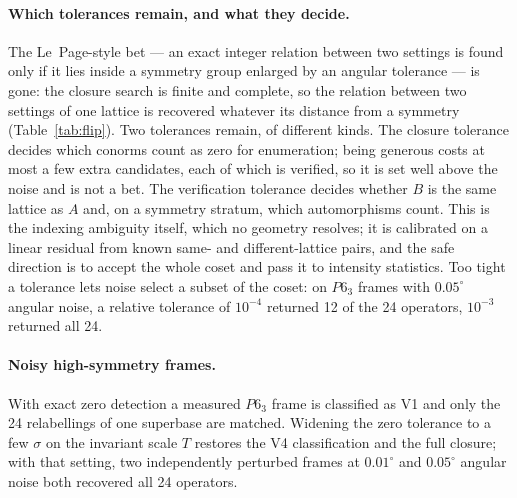\documentclass[11pt]{article}
\begin{document}
\paragraph{Which tolerances remain, and what they decide.}
The Le~Page-style bet --- an exact integer relation between two settings is found only if it lies inside a symmetry group enlarged by an angular tolerance --- is gone: the closure search is finite and complete, so the relation between two settings of one lattice is recovered whatever its distance from a symmetry (Table~\ref{tab:flip}). Two tolerances remain, of different kinds. The closure tolerance decides which conorms count as zero for enumeration; being generous costs at most a few extra candidates, each of which is verified, so it is set well above the noise and is not a bet. The verification tolerance decides whether $B$ is the same lattice as $A$ and, on a symmetry stratum, which automorphisms count. This is the indexing ambiguity itself, which no geometry resolves; it is calibrated on a linear residual from known same- and different-lattice pairs, and the safe direction is to accept the whole coset and pass it to intensity statistics. Too tight a tolerance lets noise select a subset of the coset: on $P6_3$ frames with $0.05^\circ$ angular noise, a relative tolerance of $10^{-4}$ returned 12 of the 24 operators, $10^{-3}$ returned all 24.

\paragraph{Noisy high-symmetry frames.}
With exact zero detection a measured $P6_3$ frame is classified as V1 and only the 24 relabellings of one superbase are matched. Widening the zero tolerance to a few $\sigma$ on the invariant scale $T$ restores the V4 classification and the full closure; with that setting, two independently perturbed frames at $0.01^\circ$ and $0.05^\circ$ angular noise both recovered all 24 operators.
\end{document}
